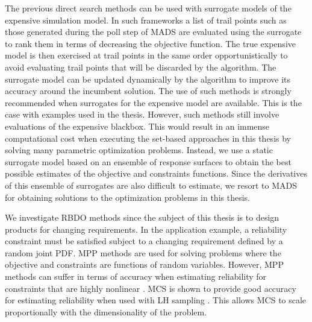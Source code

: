{The previous direct search methods can be used with surrogate models of the expensive simulation model. In such frameworks a list of trail points such as those generated during the poll step of \ac{MADS} are evaluated using the surrogate to rank them in terms of decreasing the objective function. The true expensive model is then exercised at trail points in the same order opportunistically to avoid evaluating trail points that will be discarded by the algorithm. The surrogate model can be updated dynamically by the algorithm to improve its accuracy around the incumbent solution. The use of such methods is strongly recommended when surrogates for the expensive model are available. This is the case with examples used in the thesis. However, such methods still involve evaluations of the expensive blackbox. This would result in an immense computational cost when executing the set-based approaches in this thesis by solving many parametric optimization problems. Instead, we use a static surrogate model based on an ensemble of response surfaces to obtain the best possible estimates of the objective and constraints functions. Since the derivatives of this ensemble of surrogates are also difficult to estimate, we resort to \ac{MADS} for obtaining solutions to the optimization problems in this thesis.

We investigate \ac{RBDO} methods since the subject of this thesis is to design products for changing requirements. In the application example, a reliability constraint must be satisfied subject to a changing requirement defined by a random joint \ac{PDF}. \Ac{MPP} methods are used for solving problems where the objective and constraints are functions of random variables. However, \ac{MPP} methods can suffer in terms of accuracy when estimating reliability for constraints that are highly nonlinear \cite{Du2010}. \Ac{MCS} is shown to provide good accuracy for estimating reliability when used with \ac{LH} sampling \cite{Lehky2018}. This allows \ac{MCS} to scale proportionally with the dimensionality of the problem.

}
